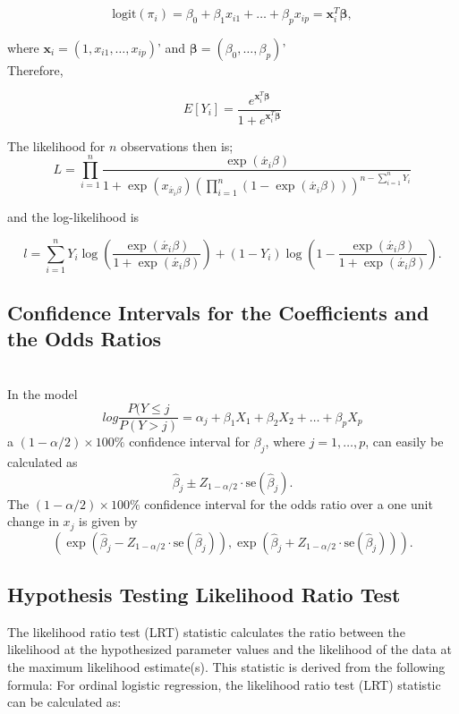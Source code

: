 \documentclass[12pt]{article}\usepackage[]{graphicx}\usepackage[]{xcolor}
\numberwithin{equation}{section}
\numberwithin{figure}{section}
\begin{document}
\begin{equation}
\text{logit}(\pi_i) = \beta_0 + \beta_1 x_{i1} + \ldots + \beta_p x_{ip}
 = \mathbf{x}_i^T \boldsymbol{\beta}, 
 \label{eq:3.8}
	\end{equation}
 
\noindent where \( \mathbf{x}_i = (1, x_{i1}, \ldots, x_{ip}) \)'
and \( \boldsymbol{\beta} = (\beta_0, \ldots, \beta_p) \)'\\
Therefore,

\[ E[Y_i] = \frac{{e^{\mathbf{x}_i^T \boldsymbol{\beta}}}}{{1 + e^{\mathbf{x}_i^T \boldsymbol{\beta}}}} \]

\noindent The likelihood for $n$ observations then is;
\begin{equation}
	L = \prod_{i=1}^{n} \frac{\exp(\acute{x_i}\beta)}{1+\exp(x_{\acute{x_i}\beta})\left(\prod_{i=1}^{n}(1-\exp(\acute{x_i}\beta))\right)^{n-\sum_{i=1}^{n}Y_i}}	
	\label{eq:3.9}
\end{equation}
	
\noindent and the log-likelihood is

\begin{equation}
	l = \sum_{i=1}^{n} Y_i \log\left(\frac{\exp(\acute{x_i}\beta)}{1 + \exp(\acute{x_i}\beta)}\right) + (1 - Y_i) \log\left(1 - \frac{\exp(\acute{x_i}\beta)}{1 + \exp(\acute{x_i}\beta)}\right).
	\label{eq:3.9}
\end{equation}

\subsection{Confidence Intervals for the Coefficients and the Odds Ratios}\\
In the model
\[
	log \frac{P(Y\le j}{P(Y>j)} = \alpha_j + \beta_1 X_1 + \beta_2 X_2 + \ldots + \beta_p X_p
\]
a \((1 - \alpha/2) \times 100\%\) confidence interval for \(\beta_j\), where \(j = 1, \ldots, p\), can easily be calculated as
\[
\hat{\beta}_j \pm Z_{1-\alpha/2} \cdot \text{se}(\hat{\beta}_j).
\]
The \((1 - \alpha/2) \times 100\%\) confidence interval for the odds ratio over a one unit change in \(x_j\) is given by
\[
\left( \exp(\hat{\beta}_j - Z_{1-\alpha/2} \cdot \text{se}(\hat{\beta}_j)), \exp(\hat{\beta}_j + Z_{1-\alpha/2} \cdot \text{se}(\hat{\beta}_j)) \right).
\]


\subsection{Hypothesis Testing Likelihood Ratio Test}
The likelihood ratio test (LRT) statistic calculates the ratio between the likelihood at the hypothesized parameter values and the likelihood of the data at the maximum likelihood estimate(s). This statistic is derived from the following formula:
For ordinal logistic regression, the likelihood ratio test (LRT) statistic can be calculated as:
\end{document}
